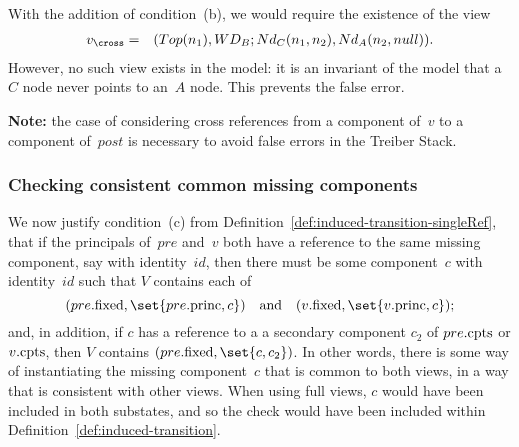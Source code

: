 With the addition of condition~(b), we would require the existence of the view
\begin{eqnarray*}
v_\cross & = &  (Top(n_1), WD_B ; Nd_C(n_1, n_2), Nd_A(n_2, null)).
\end{eqnarray*}
%
However, no such view exists in the model: it is an invariant of the model
that a $C$ node never points to an~$A$ node.  This prevents the false error.


\textbf{Note:} the case of considering cross references from a component
of~$v$ to a component of~$post$ is necessary to avoid false errors in the
Treiber Stack.




\subsubsection{Checking consistent common missing components}
\label{ssec:missing-common}

We now justify condition~(c) from
Definition~\ref{def:induced-transition-singleRef}, that if the principals
of~$pre$ and~$v$ both have a reference to the same missing component, say with
identity~$id$, then there must be some component~$c$ with identity~$id$ such
that $V$ contains each of
\[
(pre.\fixed, \set{pre.\princ, c}) \quad\mbox{and}\quad 
(v.\fixed, \set{v.\princ, c});
\]
and, in addition, if $c$ has a reference to a a secondary component $c_2$ of
$pre.\mathrm{cpts}$ or $v.\mathrm{cpts}$, then $V$ contains $(pre.\fixed, \set{c, c_2})$.
%
In other words, there is some way of instantiating the missing component~$c$
that is common to both views, in a way that is consistent with other views.
When using full views, $c$ would have been included in both substates, and so
the check would have been included within
Definition~\ref{def:induced-transition}.



